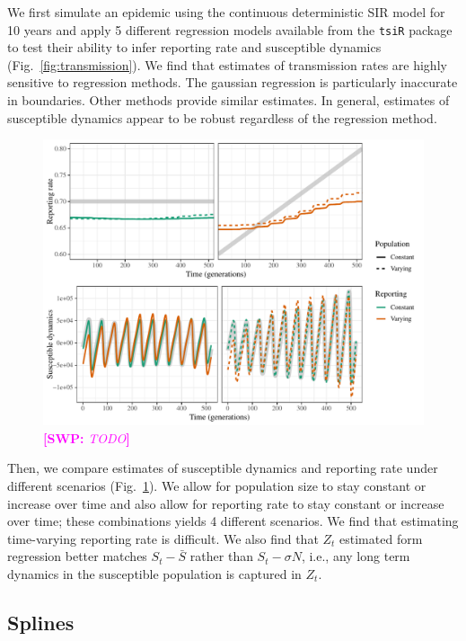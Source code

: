 \documentclass{article}
\newcommand{\fref}[1]{Fig.~\ref{fig:#1}}
\newcommand{\comment}[3]{\textcolor{#1}{\textbf{[#2: }\textsl{#3}\textbf{]}}}
\newcommand{\swp}[1]{\comment{magenta}{SWP}{#1}}
\begin{document}
We first simulate an epidemic using the continuous deterministic SIR model for 10 years and apply 5 different regression models available from the \texttt{tsiR} package to test their ability to infer reporting rate and susceptible dynamics (\fref{transmission}).
We find that estimates of transmission rates are highly sensitive to regression methods.
The gaussian regression is particularly inaccurate in boundaries.
Other methods provide similar estimates.
In general, estimates of susceptible dynamics appear to be robust regardless of the regression method.

\begin{figure}
\includegraphics[width=\textwidth]{../figure/susceptible_reconstruction_compare.pdf}
\caption{
\swp{TODO}
}
\label{fig:tsircomp}
\end{figure}

Then, we compare estimates of susceptible dynamics and reporting rate under different scenarios (\fref{tsircomp}).
We allow for population size to stay constant or increase over time and also allow for reporting rate to stay constant or increase over time; these combinations yields 4 different scenarios.
We find that estimating time-varying reporting rate is difficult.
We also find that $Z_t$ estimated form regression better matches $S_t - \bar{S}$ rather than $S_t - \sigma N$, i.e., any long term dynamics in the susceptible population is captured in $Z_t$.

\subsection{Splines}
\end{document}
